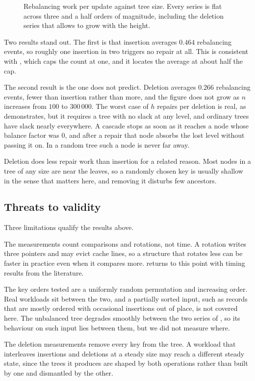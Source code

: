 \begin{figure}[t]
  \centering
  
  \caption{Rebalancing work per update against tree size. Every series is flat
  across three and a half orders of magnitude, including the deletion series that
   allows to grow with the height.}
  \label{fig:plotrotations}
\end{figure}

Two results stand out. The first is that insertion averages $0.464$ rebalancing
events, so roughly one insertion in two triggers no repair at all. This is
consistent with , which caps the count at one, and it
locates the average at about half the cap.

The second result is the one  does not predict. Deletion
averages $0.266$ rebalancing events, fewer than insertion rather than more, and
the figure does not grow as $n$ increases from $100$ to $300\,000$. The worst
case of $h$ repairs per deletion is real, as  demonstrates, but
it requires a tree with no slack at any level, and ordinary trees have slack
nearly everywhere. A cascade stops as soon as it reaches a node whose balance
factor was $0$, and after a repair that node absorbs the lost level without
passing it on. In a random tree such a node is never far away.

Deletion does less repair work than insertion for a related reason. Most nodes in
a tree of any size are near the leaves, so a randomly chosen key is usually
shallow in the sense that matters here, and removing it disturbs few ancestors.

\subsection{Threats to validity}

Three limitations qualify the results above.

The measurements count comparisons and rotations, not time. A rotation writes
three pointers and may evict cache lines, so a structure that rotates less can be
faster in practice even when it compares more.  returns to
this point with timing results from the literature.

The key orders tested are a uniformly random permutation and increasing order.
Real workloads sit between the two, and a partially sorted input, such as records
that are mostly ordered with occasional insertions out of place, is not covered
here. The unbalanced tree degrades smoothly between the two series of
, so its behaviour on such input lies between them, but we
did not measure where.

The deletion measurements remove every key from the tree. A workload that
interleaves insertions and deletions at a steady size may reach a different
steady state, since the trees it produces are shaped by both operations rather
than built by one and dismantled by the other.
